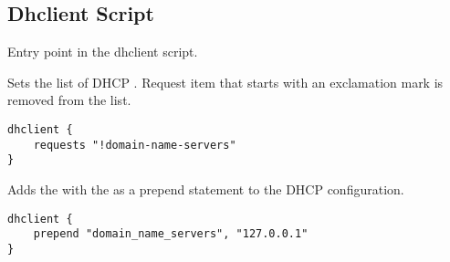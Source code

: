 \subsection{Dhclient Script}



Entry point in the dhclient script.


Sets the list of DHCP . Request item that starts with an 
exclamation mark \qcode{!} is removed from the list.

\begin{lstlisting}[style=Java]
dhclient {
    requests "!domain-name-servers"
}
\end{lstlisting}


Adds the  with the  as a prepend statement 
to the DHCP configuration.

\begin{lstlisting}[style=Java]
dhclient {
    prepend "domain_name_servers", "127.0.0.1"
}
\end{lstlisting}

